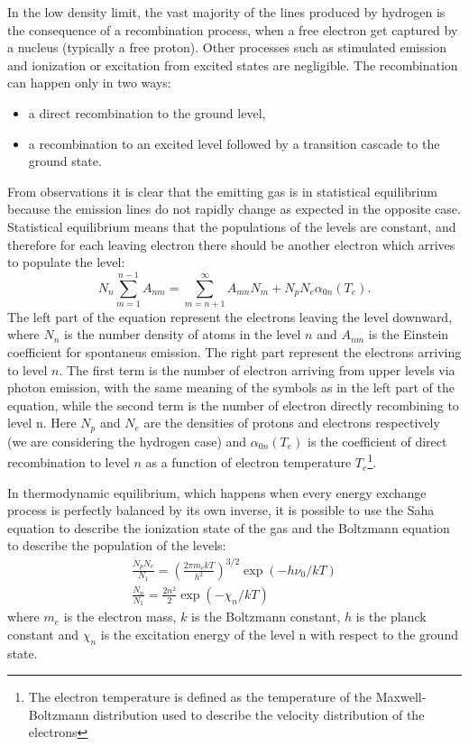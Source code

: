 \documentclass[../main.tex]{subfiles}
\begin{document}
In the low density limit, the vast majority of the lines produced by hydrogen is the consequence of a recombination process, when a free electron get captured by a nucleus (typically a free proton).
Other processes such as stimulated emission and ionization or excitation from excited states are negligible.
The recombination can happen only in two ways: 
\begin{itemize}
    \item a direct recombination to the ground level,
    \item a recombination to an excited level followed by a transition cascade to the ground state.
\end{itemize}
From observations it is clear that the emitting gas is in statistical equilibrium because the emission lines do not rapidly change as expected in the opposite case.
Statistical equilibrium means that the populations of the levels are constant, and therefore for each leaving electron there should be another electron which arrives to populate the level:
\begin{equation}
    \label{eq:statistical_eq}
    N_n\sum\limits_{m=1}^{n-1} A_{nm} = \sum\limits_{m=n+1}^{\infty} A_{mn}N_m + N_pN_e\alpha_{0n}(T_e).
\end{equation}
The left part of the equation represent the electrons leaving the level downward, where $N_n$ is the number density of atoms in the level $n$ and $A_{nm}$ is the Einstein coefficient for spontaneus emission.
The right part represent the electrons arriving to level $n$. 
The first term is the number of electron arriving from upper levels via photon emission, with the same meaning of the symbols as in the left part of the equation, while the second term is the number of electron directly recombining to level n.
Here $N_p$ and $N_e$ are the densities of protons and electrons respectively (we are considering the hydrogen case) and $\alpha_{0n}(T_e)$ is the coefficient of direct recombination to level $n$ as a function of electron temperature $T_e$\footnote{The electron temperature is defined as the temperature of the Maxwell-Boltzmann distribution used to describe the velocity distribution of the electrons}.

In thermodynamic equilibrium, which happens when every energy exchange process is perfectly balanced by its own inverse, it is possible to use the Saha equation to describe the ionization state of the gas and the Boltzmann equation to describe the population of the levels:
\begin{gather}
    \label{eq:saha}
    \frac{N_pN_e}{N_1} = \left(\frac{2\pi m_e k T}{h^2}\right)^{3/2}\exp(-h\nu_0/kT)\\
    \label{eq:bolt}
    \frac{N_n}{N_1} = \frac{2n^2}{2} \exp(-\chi_n/kT)
\end{gather}
where $m_e$ is the electron mass, $k$ is the Boltzmann constant, $h$ is the planck constant and $\chi_n$ is the excitation energy of the level n with respect to the ground state.
\end{document}
